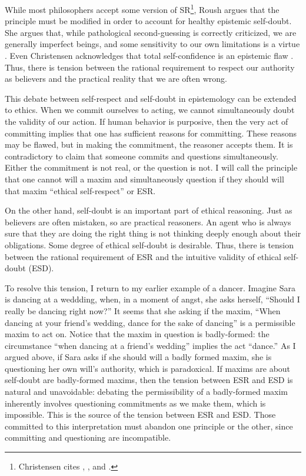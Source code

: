 \begin{isabellebody}
\begin{isamarkuptext}
While most philosophers accept some version of SR\footnote{Christensen cites \citet{vanfraassen}, 
\citet{vickers}, and \citet{koons}.}, 
Roush argues that the principle must be modified in order to account for healthy epistemic 
self-doubt. She argues that, while pathological second-guessing is correctly criticized, we are generally 
imperfect beings, and some sensitivity to our own limitations is a virtue \cite[2]{roushselfhelp}. Even Christensen 
acknowledges that total self-confidence is an epistemic flaw \cite[1]{christensen}. Thus, there is tension between the rational
requirement to respect our authority as believers and the practical reality that we are often wrong. 

This debate between self-respect and self-doubt in epistemology can be extended to ethics. When we 
commit ourselves to acting, we cannot simultaneously doubt the validity of our action. If human 
behavior is purposive, then the very act of committing implies that one has sufficient reasons for 
committing. These reasons may be flawed, but in making the commitment, the reasoner accepts them. It 
is contradictory to claim that someone commits and questions simultaneously. Either the commitment 
is not real, or the question is not. I will call the principle that one cannot will a maxim and 
simultaneously question if they should will that maxim ``ethical self-respect'' or ESR.

On the other hand, self-doubt is an important part of ethical reasoning. Just as believers are often 
mistaken, so are practical reasoners. An agent who is always sure that they are doing the right thing 
is not thinking deeply enough about their obligations. Some degree of ethical self-doubt is desirable. 
Thus, there is tension between the rational requirement of ESR and the intuitive validity of ethical 
self-doubt (ESD).

To resolve this tension, I return to my earlier example of a dancer. Imagine Sara is dancing at a 
weddding, when, in a moment of angst, she asks herself, ``Should I really be dancing right now?'' 
It seems that she asking if the maxim, ``When dancing at your friend's wedding, dance for the sake 
of dancing'' is a permissible maxim to act on. Notice that the maxim in question is badly-formed: the 
circumstance ``when dancing at a friend's wedding'' implies the act ``dance.'' As I argued above, if 
Sara asks if she should will a badly formed maxim, she is questioning her own will's authority, which
is paradoxical. If maxims are about self-doubt are badly-formed maxims, then the tension between ESR
and ESD is natural and unavoidable: debating the permissibility of a badly-formed maxim inherently
involves questioning commitments as we make them, which is impossible. This is the source of the 
tension between ESR and ESD. Those committed to this 
interpretation must abandon one principle or the other, since committing and questioning are incompatible.


\end{isamarkuptext}
\end{isabellebody}
